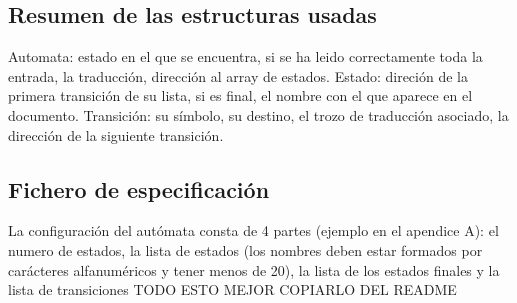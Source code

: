 \documentclass{article}
\begin{document}
\subsection{Resumen de las estructuras usadas}
Automata: estado en el que se encuentra, si se ha leido correctamente toda la
entrada, la traducción, dirección al array de estados.
Estado: direción de la primera transición de su lista, si es final, el nombre
con el que aparece en el documento.
Transición: su símbolo, su destino, el trozo de traducción asociado, la
dirección de la siguiente transición.

\subsection{Fichero de especificación}
La configuración del autómata consta de 4 partes (ejemplo en el apendice A):
el numero de estados, la lista de estados (los nombres deben estar formados por
carácteres alfanuméricos y tener menos de 20), la lista de los estados finales y
la lista de transiciones TODO ESTO MEJOR COPIARLO DEL README
\end{document}
